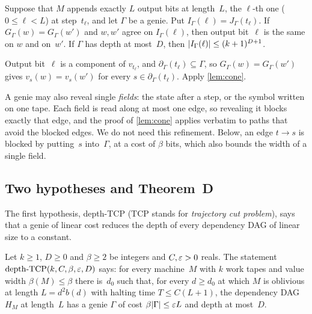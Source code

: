\begin{corollary}\label{cor:dec-output}
\notformalized
Suppose that $M$ appends exactly $L$ output bits at length~$L$, the $\ell$-th one ($0\le\ell<L$) at step~$t_\ell$,
and let $\Gamma$ be a genie. Put $I_\Gamma(\ell)=J_\Gamma(t_\ell)$. If $G_\Gamma(w)=G_\Gamma(w')$ and $w,w'$ agree on
$I_\Gamma(\ell)$, then output bit~$\ell$ is the same on $w$ and on~$w'$. If $\Gamma$ has depth at most~$D$, then
$\lvert I_\Gamma(\ell) \rvert\le(k+1)^{D+1}$.
\end{corollary}

\begin{informalproof}
Output bit~$\ell$ is a component of $v_{t_\ell}$, and $\partial_\Gamma(t_\ell)\subseteq\Gamma$, so
$G_\Gamma(w)=G_\Gamma(w')$ gives $v_s(w)=v_s(w')$ for every $s\in\partial_\Gamma(t_\ell)$. Apply \cref{lem:cone}.
\end{informalproof}

\begin{remark}\label{rem:dec-field}
A genie may also reveal single \emph{fields}: the state after a step, or the symbol written on one tape. Each field
is read along at most one edge, so revealing it blocks exactly that edge, and the proof of \cref{lem:cone} applies
verbatim to paths that avoid the blocked edges. We do not need this refinement. Below, an edge $t\to s$ is blocked by
putting~$s$ into~$\Gamma$, at a cost of $\beta$ bits, which also bounds the width of a single field.
\end{remark}

\subsection{Two hypotheses and Theorem~D}\label{sec:dec-D}

The first hypothesis, depth-TCP (TCP stands for \emph{trajectory cut problem}), says that a genie of linear cost
reduces the depth of every dependency DAG of linear size to a constant.

\begin{definition}\label{def:depth-tcp}
Let $k\ge1$, $D\ge0$ and $\beta\ge2$ be integers and $C,\varepsilon>0$ reals. The statement
$\mathrm{depth}\text{-}\mathrm{TCP}(k,C,\beta,\varepsilon,D)$ says: for every machine~$M$ with $k$ work tapes and value width
$\beta(M)\le\beta$ there is~$d_0$ such that, for every $d\ge d_0$ at which $M$ is oblivious at length $L=d^2b(d)$
with halting time $T\le C(L+1)$, the dependency DAG $H_M$ at length~$L$ has a genie $\Gamma$ of cost
$\beta\lvert \Gamma \rvert\le\varepsilon L$ and depth at most~$D$.
\end{definition}

